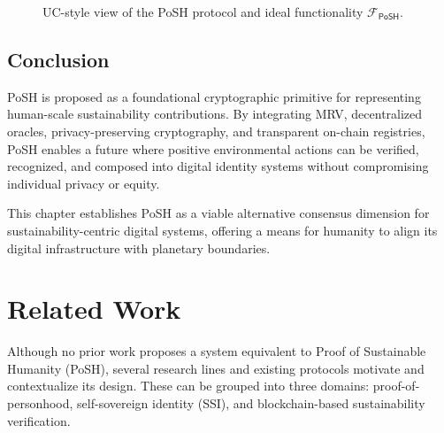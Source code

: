 \documentclass[11pt,a4paper]{report}
\theoremstyle{definition}
\theoremstyle{remark}
\begin{document}
\begin{figure}[h!]
  \centering
  \caption{UC-style view of the PoSH protocol and ideal functionality
           $\mathcal{F}_{\textsf{PoSH}}$.}
  \label{fig:posh-uc-model}
\end{figure}

\section{Conclusion}

PoSH is proposed as a foundational cryptographic primitive for representing
human-scale sustainability contributions. By integrating MRV, decentralized
oracles, privacy-preserving cryptography, and transparent on-chain registries,
PoSH enables a future where positive environmental actions can be verified,
recognized, and composed into digital identity systems without compromising
individual privacy or equity.

This chapter establishes PoSH as a viable alternative consensus dimension for
sustainability-centric digital systems, offering a means for humanity to align
its digital infrastructure with planetary boundaries.

\chapter{Related Work}
\label{chap:related}

Although no prior work proposes a system equivalent to Proof of Sustainable
Humanity (PoSH), several research lines and existing protocols motivate and
contextualize its design. These can be grouped into three domains:
proof-of-personhood, self-sovereign identity (SSI), and blockchain-based
sustainability verification.
\end{document}
